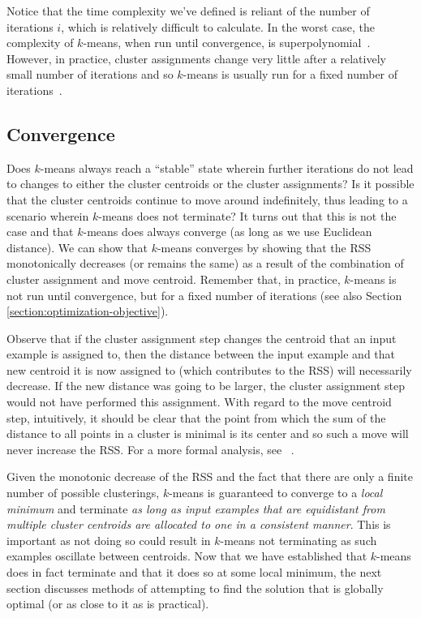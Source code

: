 Notice that the time complexity we've defined is reliant of the number of iterations $i$, which is relatively difficult to calculate. In the worst case, the complexity of $k$-means, when run until convergence, is superpolynomial~\cite{10.1145/1137856.1137880}. However, in practice, cluster assignments change very little after a relatively small number of iterations and so $k$-means is usually run for a fixed number of iterations~\cite[Chapter~16]{manning2008introduction}.

\subsection{Convergence}
\label{sec:converge}
Does $k$-means always reach a ``stable'' state wherein further iterations do not lead to changes to either the cluster centroids or the cluster assignments? Is it possible that the cluster centroids continue to move around indefinitely, thus leading to a scenario wherein $k$-means does not terminate? It turns out that this is not the case and that $k$-means does always converge (as long as we use Euclidean distance). We can show that $k$-means converges by showing that the RSS monotonically decreases (or remains the same) as a result of the combination of cluster assignment and move centroid. Remember that, in practice, $k$-means is not run until convergence, but for a fixed number of iterations (see also Section \ref{section:optimization-objective}). 

Observe that if the cluster assignment step changes the centroid that an input example is assigned to, then the distance between the input example and that new centroid it is now assigned to (which contributes to the RSS) will necessarily decrease. If the new distance was going to be larger, the cluster assignment step would not have performed this assignment. With regard to the move centroid step, intuitively, it should be clear that the point from which the sum of the distance to all points in a cluster is minimal is its center and so such a move will never increase the RSS. For a  more formal analysis, see ~\cite[Chapter~16]{manning2008introduction}.

Given the monotonic decrease of the RSS and the fact that there are only a finite number of possible clusterings, $k$-means is guaranteed to converge to a \emph{local minimum} and terminate \emph{as long as input examples that are equidistant from multiple cluster centroids are allocated to one in a consistent manner}. This is important as not doing so could result in $k$-means not terminating as such examples oscillate between centroids. Now that we have established that $k$-means does in fact terminate and that it does so at some local minimum, the next section discusses methods of attempting to find the solution that is globally optimal (or as close to it as is practical).

